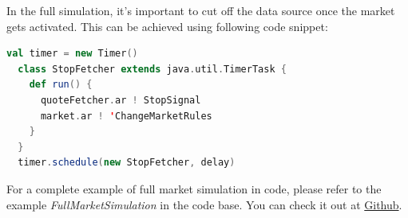 In the full simulation, it's important to cut off the data source once the market gets activated. This can be achieved using following code snippet:

\begin{lstlisting}[language=Scala]
  val timer = new Timer()
  class StopFetcher extends java.util.TimerTask {
    def run() {
      quoteFetcher.ar ! StopSignal
      market.ar ! 'ChangeMarketRules
    }
  }
  timer.schedule(new StopFetcher, delay)
\end{lstlisting}

For a complete example of full market simulation in code, please refer to the example \emph{FullMarketSimulation} in the code base. You can check it out at \href{https://github.com/merlinND/TradingSimulation/blob/master/ts/src/main/scala/ch/epfl/ts/example/FullMarketSimulation.scala}{Github}.

